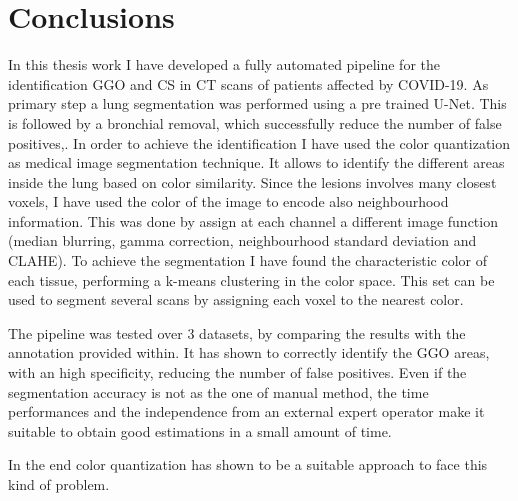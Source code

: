 \documentclass{standalone}
\begin{document}
	\chapter*{Conclusions}
	
	In this thesis work I have developed a fully automated pipeline for the identification GGO and CS in CT scans of patients affected by COVID-19.
	As primary step a lung segmentation was performed using a pre trained U-Net. This is followed by a bronchial removal, which successfully reduce the number of false positives,.  
	In order to achieve the identification I have used the color quantization as medical image segmentation technique.  It allows to identify the different areas inside the lung based on color similarity. Since the lesions involves many closest voxels, I have used the color of the image to encode also neighbourhood information. This was done by assign at each channel a different image function (median blurring, gamma correction, neighbourhood standard deviation and CLAHE). To achieve the segmentation I have found the characteristic color of each tissue, performing a k-means clustering in the color space. This set can be used to segment several scans by assigning each voxel to the nearest color. 
	
	The pipeline was tested over $3$ datasets, by comparing the results with the annotation provided within. It has shown to correctly identify the GGO areas, with an high specificity, reducing the number of false positives. Even if the segmentation accuracy is not as the one of manual method, the time performances and the independence from an external expert operator make it suitable to obtain good estimations in a small amount of time. 

	In the end color quantization has shown to be a suitable approach to face this kind of problem. 
	
\end{document}
